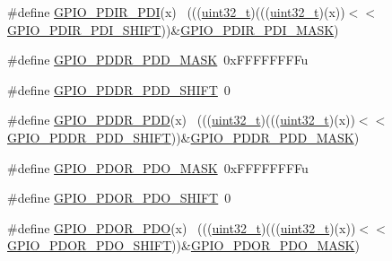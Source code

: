 \begin{DoxyCompactItemize}
\item 
\#define \hyperlink{group___g_p_i_o___register___masks_ga51ee39b660f7d6b95d1348601346dd0d}{G\+P\+I\+O\+\_\+\+P\+D\+I\+R\+\_\+\+P\+DI}(x)                                              ~(((\hyperlink{_p_e___types_8h_a33594304e786b158f3fb30289278f5af}{uint32\+\_\+t})(((\hyperlink{_p_e___types_8h_a33594304e786b158f3fb30289278f5af}{uint32\+\_\+t})(x))$<$$<$\hyperlink{group___g_p_i_o___register___masks_ga99fd9212dd769bb1964a28a864c6c741}{G\+P\+I\+O\+\_\+\+P\+D\+I\+R\+\_\+\+P\+D\+I\+\_\+\+S\+H\+I\+FT}))\&\hyperlink{group___g_p_i_o___register___masks_gacb7c8cc976937906c8e803811a7fbb68}{G\+P\+I\+O\+\_\+\+P\+D\+I\+R\+\_\+\+P\+D\+I\+\_\+\+M\+A\+SK})
\item 
\#define \hyperlink{group___g_p_i_o___register___masks_ga67567a60f48d2bfb5584cd8de8936788}{G\+P\+I\+O\+\_\+\+P\+D\+D\+R\+\_\+\+P\+D\+D\+\_\+\+M\+A\+SK}~0x\+F\+F\+F\+F\+F\+F\+F\+Fu
\item 
\#define \hyperlink{group___g_p_i_o___register___masks_gacdd12c96f7650759c90a98bb606bd776}{G\+P\+I\+O\+\_\+\+P\+D\+D\+R\+\_\+\+P\+D\+D\+\_\+\+S\+H\+I\+FT}~0
\item 
\#define \hyperlink{group___g_p_i_o___register___masks_gaa61392b4895082b114fe3d251998069d}{G\+P\+I\+O\+\_\+\+P\+D\+D\+R\+\_\+\+P\+DD}(x)                                              ~(((\hyperlink{_p_e___types_8h_a33594304e786b158f3fb30289278f5af}{uint32\+\_\+t})(((\hyperlink{_p_e___types_8h_a33594304e786b158f3fb30289278f5af}{uint32\+\_\+t})(x))$<$$<$\hyperlink{group___g_p_i_o___register___masks_gacdd12c96f7650759c90a98bb606bd776}{G\+P\+I\+O\+\_\+\+P\+D\+D\+R\+\_\+\+P\+D\+D\+\_\+\+S\+H\+I\+FT}))\&\hyperlink{group___g_p_i_o___register___masks_ga67567a60f48d2bfb5584cd8de8936788}{G\+P\+I\+O\+\_\+\+P\+D\+D\+R\+\_\+\+P\+D\+D\+\_\+\+M\+A\+SK})
\item 
\#define \hyperlink{group___g_p_i_o___register___masks_gafd2a8274691295293b3cabfe86089801}{G\+P\+I\+O\+\_\+\+P\+D\+O\+R\+\_\+\+P\+D\+O\+\_\+\+M\+A\+SK}~0x\+F\+F\+F\+F\+F\+F\+F\+Fu
\item 
\#define \hyperlink{group___g_p_i_o___register___masks_ga495b5f1e63de863534ce0c5f25f137ab}{G\+P\+I\+O\+\_\+\+P\+D\+O\+R\+\_\+\+P\+D\+O\+\_\+\+S\+H\+I\+FT}~0
\item 
\#define \hyperlink{group___g_p_i_o___register___masks_ga79d6ac6995e51c108cc38b287e688f0d}{G\+P\+I\+O\+\_\+\+P\+D\+O\+R\+\_\+\+P\+DO}(x)                                              ~(((\hyperlink{_p_e___types_8h_a33594304e786b158f3fb30289278f5af}{uint32\+\_\+t})(((\hyperlink{_p_e___types_8h_a33594304e786b158f3fb30289278f5af}{uint32\+\_\+t})(x))$<$$<$\hyperlink{group___g_p_i_o___register___masks_ga495b5f1e63de863534ce0c5f25f137ab}{G\+P\+I\+O\+\_\+\+P\+D\+O\+R\+\_\+\+P\+D\+O\+\_\+\+S\+H\+I\+FT}))\&\hyperlink{group___g_p_i_o___register___masks_gafd2a8274691295293b3cabfe86089801}{G\+P\+I\+O\+\_\+\+P\+D\+O\+R\+\_\+\+P\+D\+O\+\_\+\+M\+A\+SK})
$$
\end{DoxyCompactItemize}
